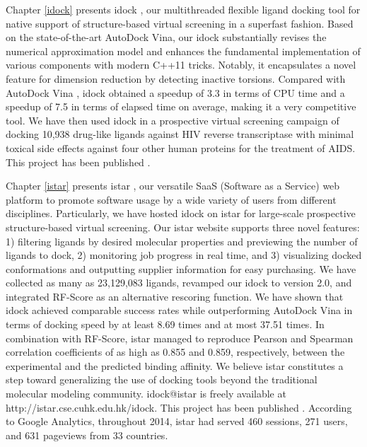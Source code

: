 Chapter \ref{idock} presents idock \citep{1153}, our multithreaded flexible ligand docking tool for native support of structure-based virtual screening in a superfast fashion. Based on the state-of-the-art AutoDock Vina, our idock substantially revises the numerical approximation model and enhances the fundamental implementation of various components with modern C++11 tricks. Notably, it encapsulates a novel feature for dimension reduction by detecting inactive torsions. Compared with AutoDock Vina \citep{595}, idock obtained a speedup of 3.3 in terms of CPU time and a speedup of 7.5 in terms of elapsed time on average, making it a very competitive tool. We have then used idock in a prospective virtual screening campaign of docking 10,938 drug-like ligands against HIV reverse transcriptase with minimal toxical side effects against four other human proteins for the treatment of AIDS. This project has been published \citep{1153}.

Chapter \ref{istar} presents istar \citep{1362}, our versatile SaaS (Software as a Service) web platform to promote software usage by a wide variety of users from different disciplines. Particularly, we have hosted idock on istar for large-scale prospective structure-based virtual screening. Our istar website supports three novel features: 1) filtering ligands by desired molecular properties and previewing the number of ligands to dock, 2) monitoring job progress in real time, and 3) visualizing docked conformations and outputting supplier information for easy purchasing. We have collected as many as 23,129,083 ligands, revamped our idock to version 2.0, and integrated RF-Score \citep{564} as an alternative rescoring function. We have shown that idock achieved comparable success rates while outperforming AutoDock Vina in terms of docking speed by at least 8.69 times and at most 37.51 times. In combination with RF-Score, istar managed to reproduce Pearson and Spearman correlation coefficients of as high as 0.855 and 0.859, respectively, between the experimental and the predicted binding affinity. We believe istar constitutes a step toward generalizing the use of docking tools beyond the traditional molecular modeling community. idock@istar is freely available at http://istar.cse.cuhk.edu.hk/idock. This project has been published \citep{1362}. According to Google Analytics, throughout 2014, istar had served 460 sessions, 271 users, and 631 pageviews from 33 countries.

